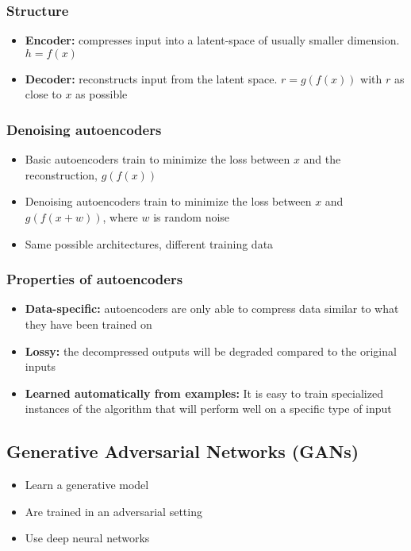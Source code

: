 \documentclass{article}
\begin{document}
        \subsubsection{Structure}
        \begin{itemize}
            \item \textbf{Encoder:} compresses input into a latent-space of usually smaller dimension. $h = f(x)$
            \item \textbf{Decoder:} reconstructs input from the latent space. $r = g(f(x))$ with $r$ as close to $x$ as possible
        \end{itemize}

        \subsubsection{Denoising autoencoders}
        \begin{itemize}
            \item Basic autoencoders train to minimize the loss between $x$ and the reconstruction, $g(f(x))$
            \item Denoising autoencoders train to minimize the loss between $x$ and $g(f(x+w))$, where $w$ is random noise
            \item Same possible architectures, different training data
        \end{itemize}

        \subsubsection{Properties of autoencoders}
        \begin{itemize}
            \item \textbf{Data-specific:} autoencoders are only able to compress data similar to what they have been trained on
            \item \textbf{Lossy:} the decompressed outputs will be degraded compared to the original inputs
            \item \textbf{Learned automatically from examples:} It is easy to train specialized instances of the algorithm that will perform well on a specific type of input
        \end{itemize}

        \subsection{Generative Adversarial Networks (GANs)}
        \begin{itemize}
            \item Learn a generative model
            \item Are trained in an adversarial setting
            \item Use deep neural networks
        \end{itemize}
\end{document}
